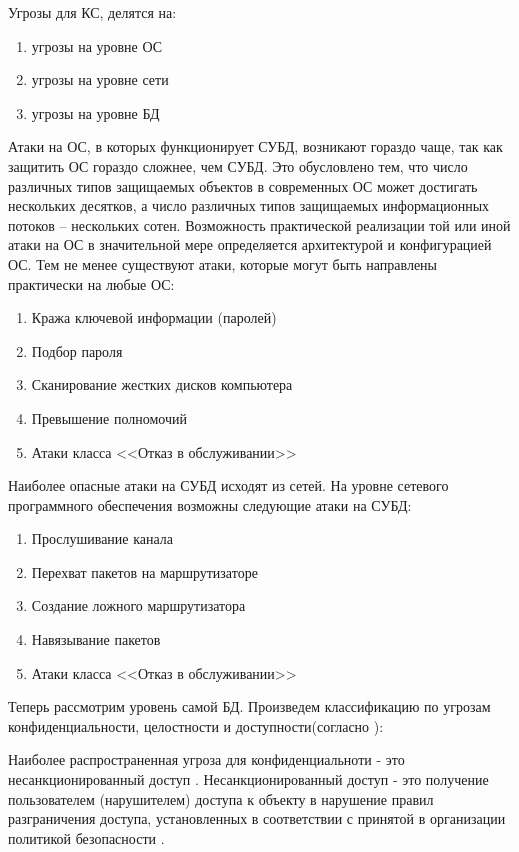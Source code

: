 Угрозы для КС, делятся на:
\begin{enumerate}
	\item угрозы на уровне ОС
	\item угрозы на уровне сети
	\item угрозы на уровне БД
\end{enumerate}
Атаки на ОС, в которых функционирует СУБД, возникают гораздо чаще, так как защитить ОС гораздо сложнее, чем СУБД. Это обусловлено тем, что число различных типов защищаемых объектов в современных ОС может достигать нескольких десятков, а число различных типов защищаемых информационных потоков -- нескольких сотен. Возможность практической реализации той или иной атаки на ОС в значительной мере определяется архитектурой и конфигурацией ОС. Тем не менее существуют атаки, которые могут быть направлены практически на любые ОС:
\begin{enumerate}
	\item Кража ключевой информации (паролей)
	\item Подбор пароля
	\item Сканирование жестких дисков компьютера
	\item Превышение полномочий
	\item Атаки класса <<Отказ в обслуживании>>
\end{enumerate}
Наиболее опасные атаки на СУБД исходят из сетей. На уровне сетевого
программного обеспечения возможны следующие атаки на СУБД:
\begin{enumerate}
	\item Прослушивание канала
	\item Перехват пакетов на маршрутизаторе
	\item Создание ложного маршрутизатора
	\item Навязывание пакетов
	\item Атаки класса <<Отказ в обслуживании>>
\end{enumerate}

Теперь рассмотрим уровень самой БД. Произведем классификацию по угрозам конфиденциальности, целостности и доступности(согласно \autocite{Ytebov2008}):

Наиболее распространенная угроза для конфиденциальноти - это несанкционированный доступ \autocite[сс. 21]{Skakun}.
Несанкционированный доступ - это  получение пользователем (нарушителем) доступа к объекту в нарушение правил разграничения доступа, установленных в соответствии с принятой в организации политикой безопасности \autocite[сс. 21]{Skakun}.

